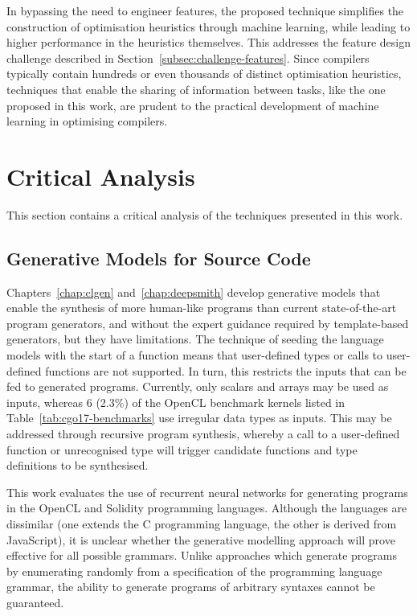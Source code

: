 In bypassing the need to engineer features, the proposed technique simplifies the construction of optimisation heuristics through machine learning, while leading to higher performance in the heuristics themselves. This addresses the feature design challenge described in Section~\ref{subsec:challenge-features}. Since compilers typically contain hundreds or even thousands of distinct optimisation heuristics, techniques that enable the sharing of information between tasks, like the one proposed in this work, are prudent to the practical development of machine learning in optimising compilers.


\section{Critical Analysis}
\label{sec:conclusions-critical-analysis}

This section contains a critical analysis of the techniques presented in this work.


\subsection{Generative Models for Source Code}

Chapters~\ref{chap:clgen} and~\ref{chap:deepsmith} develop generative models that enable the synthesis of more human-like programs than current state-of-the-art program generators, and without the expert guidance required by template-based generators, but they have limitations. The technique of seeding the language models with the start of a function means that user-defined types or calls to user-defined functions are not supported. In turn, this restricts the inputs that can be fed to generated programs. Currently, only scalars and arrays may be used as inputs, whereas 6 (2.3\%) of the OpenCL benchmark kernels listed in Table~\ref{tab:cgo17-benchmarks} use irregular data types as inputs. This may be addressed through recursive program synthesis, whereby a call to a user-defined function or unrecognised type will trigger candidate functions and type definitions to be synthesised.

This work evaluates the use of recurrent neural networks for generating programs in the OpenCL and Solidity programming languages. Although the languages are dissimilar (one extends the C programming language, the other is derived from JavaScript), it is unclear whether the generative modelling approach will prove effective for all possible grammars. Unlike approaches which generate programs by enumerating randomly from a specification of the programming language grammar, the ability to generate programs of arbitrary syntaxes cannot be guaranteed.

